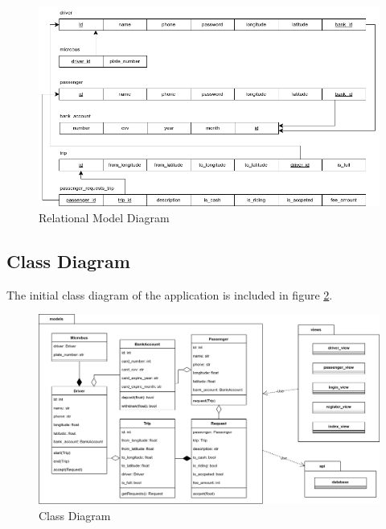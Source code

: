 \documentclass{BusMateSRS}
\begin{document}
\begin{figure}[ht!]
	\begin{center}
		\includegraphics[width=\columnwidth]{drawings/relational-model.drawio.png}
	\end{center}
	\caption{Relational Model Diagram}
	\label{fig:relational-model}
\end{figure}

\pagebreak

\subsection{Class Diagram}
The initial class diagram of the application is included in figure
\ref{fig:class-diagram}.

\begin{figure}[ht!]
	\begin{center}
		\includegraphics[width=\columnwidth]{drawings/class-diagram.drawio.png}
	\end{center}
	\caption{Class Diagram}
	\label{fig:class-diagram}
\end{figure}
\end{document}
